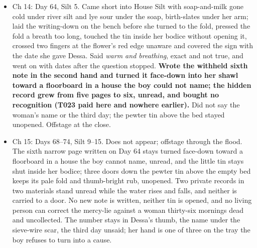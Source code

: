 \documentclass{design/chronicle}
\begin{document}
{\begin{itemize}[leftmargin=1.4em,itemsep=1pt,topsep=3pt,parsep=0pt]
\item Ch 14: Day 64, Silt 5. Came short into House Silt with soap-and-milk gone cold under river silt and lye sour under the soap, birth-slates under her arm; laid the writing-down on the bench before she turned to the fold, pressed the fold a breath too long, touched the tin inside her bodice without opening it, crossed two fingers at the flower’s red edge unaware and covered the sign with the date she gave Dessa. Said \emph{warm and breathing}, exact and not true, and went on with dates after the question stopped. \textbf{Wrote the withheld sixth note in the second hand and turned it face-down into her shawl toward a floorboard in a house the boy could not name; the hidden record grew from five pages to six, unread, and bought no recognition (T023 paid here and nowhere earlier).} Did not say the woman’s name or the third day; the pewter tin above the bed stayed unopened. Offstage at the close.

\end{itemize}

\begin{itemize}[leftmargin=1.4em,itemsep=1pt,topsep=3pt,parsep=0pt]

\item Ch 15: Days 68–74, Silt 9–15. Does not appear; offstage through the flood. The sixth narrow page written on Day 64 stays turned face-down toward a floorboard in a house the boy cannot name, unread, and the little tin stays shut inside her bodice; three doors down the pewter tin above the empty bed keeps its pale fold and thumb-bright rub, unopened. Two private records in two materials stand unread while the water rises and falls, and neither is carried to a door. No new note is written, neither tin is opened, and no living person can correct the mercy-lie against a woman thirty-six mornings dead and uncollected. The number stays in Dessa’s thumb, the name under the sieve-wire scar, the third day unsaid; her hand is one of three on the tray the boy refuses to turn into a cause.

\end{itemize}

\begin{itemize}[leftmargin=1.4em,itemsep=1pt,topsep=3pt,parsep=0pt]


\end{itemize}}
\end{document}

